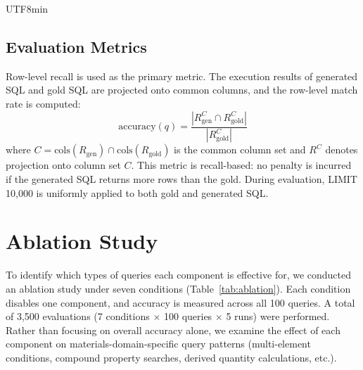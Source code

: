 \documentclass[sn-mathphys,Numbered]{sn-jnl}
\begin{document}
\begin{CJK}{UTF8}{min}
\subsection{Evaluation Metrics}

Row-level recall is used as the primary metric.
The execution results of generated SQL and gold SQL are projected
onto common columns, and the row-level match rate is computed:
\begin{equation}
  \text{accuracy}(q) = \frac{|R_\text{gen}^{C} \cap R_\text{gold}^{C}|}{|R_\text{gold}^{C}|}
  \label{eq:column_aware}
\end{equation}
where $C = \text{cols}(R_\text{gen}) \cap \text{cols}(R_\text{gold})$
is the common column set and $R^C$ denotes projection onto column
set $C$.
This metric is recall-based: no penalty is incurred if the generated
SQL returns more rows than the gold.
During evaluation, LIMIT 10{,}000 is uniformly applied to both
gold and generated SQL.

\section{Ablation Study}
\label{sec:ablation}

To identify which types of queries each component is effective for,
we conducted an ablation study under seven conditions
(Table~\ref{tab:ablation}).
Each condition disables one component, and accuracy is measured
across all 100 queries.
A total of 3{,}500 evaluations (7 conditions $\times$ 100 queries
$\times$ 5 runs) were performed.
Rather than focusing on overall accuracy alone, we examine the
effect of each component on materials-domain-specific query
patterns (multi-element conditions, compound property searches,
derived quantity calculations, etc.).


\end{CJK}
\end{document}
